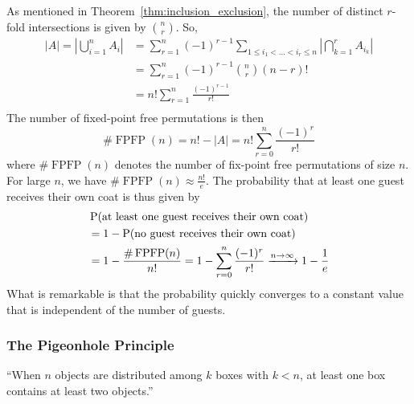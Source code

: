 \begin{example}[Opera]
As mentioned in Theorem~\ref{thm:inclusion_exclusion}, the number of distinct $r$-fold intersections is given by $\binom{n}{r}$.
So,
\[
\begin{aligned}
  |A| = \left|\bigcup_{i=1}^{n} A_i\right|
      & = \sum_{r=1}^{n} (-1)^{r-1} \sum_{1\le i_1<\dots<i_r\le n} \left|\bigcap_{k=1}^r A_{i_k}\right| \\
      & = \sum_{r=1}^{n} (-1)^{r-1} \binom{n}{r} (n-r)! \\
      & = n! \sum_{r=1}^{n} \frac{(-1)^{r-1}}{r!} \\
\end{aligned}
\]
The number of fixed-point free permutations is then
\[
\#\operatorname{FPFP}(n) = n! - |A| = n! \sum_{r=0}^{n} \frac{(-1)^{r}}{r!}
\]
where $\#\operatorname{FPFP}(n)$ denotes the number of fix-point free permutations of size $n$.
For large $n$, we have \(\#\operatorname{FPFP}(n) \approx \frac{n!}{e}\).
The probability that at least one guest receives their own coat is thus given by
\[
\begin{aligned}
& \operatorname{P}(\text{at least one guest receives their own coat})  \\
& = 1 - \operatorname{P}(\text{no guest receives their own coat}) \\
& = 1 - \frac{\#\operatorname{FPFP}(n)}{n!}
= 1 - \sum_{r=0}^{n} \frac{(-1)^{r}}{r!}
\xrightarrow{n\to\infty} 1 - \frac{1}{e} 
\end{aligned}
\]
What is remarkable is that the probability quickly converges to a constant value that is independent of the number of guests.
\end{example}



\subsubsection{The Pigeonhole Principle}
\label{subsubsec:pigeonhole}
``When $n$ objects are distributed among $k$ boxes with $k<n$, at least one box contains at least two objects.''


